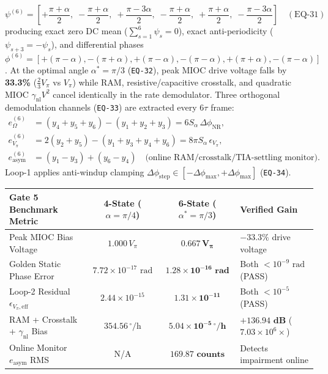 \documentclass[11pt,a4paper]{article}
\begin{document}
\begin{equation}
\psi^{(6)} = \left[+\frac{\pi+\alpha}{2},\; -\frac{\pi+\alpha}{2},\; +\frac{\pi-3\alpha}{2},\; -\frac{\pi+\alpha}{2},\; +\frac{\pi+\alpha}{2},\; -\frac{\pi-3\alpha}{2}\right] \quad (\text{EQ-31})
\end{equation}
producing exact zero DC mean ($\sum_{s=1}^6 \psi_s = 0$), exact anti-periodicity ($\psi_{s+3} = -\psi_s$), and differential phases $\phi^{(6)} = [+(\pi-\alpha), -(\pi+\alpha), +(\pi-\alpha), -(\pi-\alpha), +(\pi+\alpha), -(\pi-\alpha)]$. At the optimal angle $\alpha^* = \pi/3$ (\texttt{EQ-32}), peak MIOC drive voltage falls by \textbf{33.3\%} ($\frac{2}{3}V_\pi$ vs $V_\pi$) while RAM, resistive/capacitive crosstalk, and quadratic MIOC $\gamma_{\text{nl}}V^2$ cancel identically in the rate demodulator. Three orthogonal demodulation channels (\texttt{EQ-33}) are extracted every $6\tau$ frame:
\begin{align}
e_\Omega^{(6)} &= (y_4 + y_5 + y_6) - (y_1 + y_2 + y_3) = 6 S_\alpha\,\Delta\phi_{\text{NR}}, \\
e_{V_\pi}^{(6)} &= 2(y_2 + y_5) - (y_1 + y_3 + y_4 + y_6) = 8\pi S_\alpha\,\epsilon_{V_\pi}, \\
e_{\text{asym}}^{(6)} &= (y_1 - y_3) + (y_6 - y_4) \quad \text{(online RAM/crosstalk/TIA-settling monitor)}.
\end{align}
Loop-1 applies anti-windup clamping $\Delta\phi_{\text{step}} \in [-\Delta\phi_{\max}, +\Delta\phi_{\max}]$ (\texttt{EQ-34}).

\small
\begin{tabularx}{\textwidth}{@{}l c c X@{}}
\toprule
\textbf{Gate 5 Benchmark Metric} & \textbf{4-State ($\alpha=\pi/4$)} & \textbf{6-State ($\alpha^*=\pi/3$)} & \textbf{Verified Gain} \\
\midrule
Peak MIOC Bias Voltage & $1.000\,V_\pi$ & $\mathbf{0.667\,V_\pi}$ & $-33.3\%$ drive voltage \\
Golden Static Phase Error & $7.72\times 10^{-17}\text{ rad}$ & $\mathbf{1.28\times 10^{-16}\text{ rad}}$ & Both $< 10^{-9}\text{ rad}$ (PASS) \\
Loop-2 Residual $\epsilon_{V_\pi,\text{eff}}$ & $2.44\times 10^{-15}$ & $\mathbf{1.31\times 10^{-11}}$ & Both $< 10^{-5}$ (PASS) \\
RAM + Crosstalk + $\gamma_{\text{nl}}$ Bias & $354.56\,^\circ/\text{h}$ & $\mathbf{5.04\times 10^{-5}\,^\circ/\text{h}}$ & $\mathbf{+136.94\text{ dB}}$ ($7.03\times 10^6\times$) \\
Online Monitor $e_{\text{asym}}$ RMS & N/A & $\mathbf{169.87\text{ counts}}$ & Detects impairment online \\
\bottomrule
\end{tabularx}
\normalsize
\end{document}
